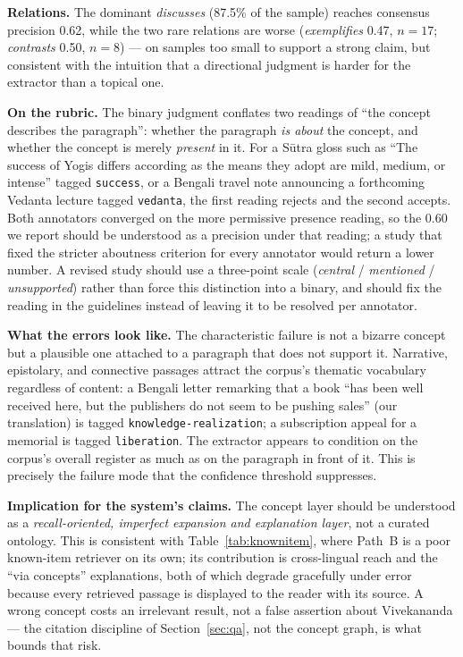 \documentclass[11pt,a4paper]{article}
\begin{document}
\textbf{Relations.} The dominant \emph{discusses} (87.5\% of the sample)
reaches consensus precision 0.62, while the two rare relations are worse
(\emph{exemplifies} 0.47, $n=17$; \emph{contrasts} 0.50, $n=8$) --- on
samples too small to support a strong claim, but consistent with the
intuition that a directional judgment is harder for the extractor than a
topical one.

\textbf{On the rubric.} The binary judgment conflates two readings of
``the concept describes the paragraph'': whether the paragraph \emph{is
about} the concept, and whether the concept is merely \emph{present} in
it. For a S\=utra gloss such as ``The success of Yogis differs according
as the means they adopt are mild, medium, or intense'' tagged
\texttt{success}, or a Bengali travel note announcing a forthcoming
Vedanta lecture tagged \texttt{vedanta}, the first reading rejects and
the second accepts. Both annotators converged on the more permissive
presence reading, so the 0.60 we report should be understood as a
precision under that reading; a study that fixed the stricter aboutness
criterion for every annotator would return a lower number. A revised
study should use a three-point scale (\emph{central} / \emph{mentioned} /
\emph{unsupported}) rather than force this distinction into a binary, and
should fix the reading in the guidelines instead of leaving it to be
resolved per annotator.

\textbf{What the errors look like.} The characteristic failure is not a
bizarre concept but a plausible one attached to a paragraph that does not
support it. Narrative, epistolary, and connective passages attract the
corpus's thematic vocabulary regardless of content: a Bengali letter
remarking that a book ``has been well received here, but the publishers
do not seem to be pushing sales'' (our translation) is tagged
\texttt{knowledge-realization}; a subscription appeal for a memorial is
tagged \texttt{liberation}. The
extractor appears to condition on the corpus's overall register as much
as on the paragraph in front of it. This is precisely the failure mode
that the confidence threshold suppresses.

\textbf{Implication for the system's claims.} The concept layer should
be understood as a \emph{recall-oriented, imperfect expansion and
explanation layer}, not a curated ontology. This is consistent with
Table~\ref{tab:knownitem}, where Path~B is a poor known-item retriever
on its own; its contribution is cross-lingual reach and the
``via concepts'' explanations, both of which degrade gracefully under
error because every retrieved passage is displayed to the reader with
its source. A wrong concept costs an irrelevant result, not a false
assertion about Vivekananda --- the citation discipline of
Section~\ref{sec:qa}, not the concept graph, is what bounds that risk.
\end{document}
